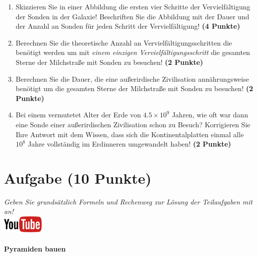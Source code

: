 \documentclass[a4paper, 9pt]{scrartcl}\usepackage[]{graphicx}\usepackage[]{xcolor}
\begin{document}
\begin{enumerate}
\item Skizzieren Sie in einer Abbildung die ersten vier Schritte der
  Vervielf{\"a}ltigung der Sonden in der Galaxie! Beschriften Sie die Abbildung
  mit der Dauer und der Anzahl an Sonden f{\"u}r jeden Schritt der Vervielf{\"a}ltigung! \textbf{(4 Punkte)}
\item Berechnen Sie die theoretische Anzahl an Vervielf{\"a}ltigungsschritten die
  ben{\"o}tigt werden um mit \textit{einem einzigen Vervielf{\"a}ltigungsschritt} die
  gesamten Sterne der Milchstra{\ss}e mit Sonden zu besuchen! \textbf{(2 Punkte)}
\item Berechnen Sie die Dauer, die eine au{\ss}erirdische Zivilisation
  ann{\"a}hrungsweise ben{\"o}tigt um die gesamten Sterne der Milchstra{\ss}e mit
  Sonden zu besuchen! \textbf{(2 Punkte)}
\item Bei einem vermutetet Alter der Erde von $\ensuremath{4.5\times 10^{9}}$ Jahren,
  wie oft war dann eine Sonde einer au{\ss}erirdischen Zivilisation schon zu
  Besuch? Korrigieren Sie Ihre Antwort mit dem Wissen, dass sich die
  Kontinentalplatten einmal alle $\ensuremath{10^{8}}$ Jahre vollst{\"a}ndig im
  Erdinneren umgewandelt haben! \textbf{(2 Punkte)}
\end{enumerate}


 
\clearpage

\section{Aufgabe \hfill (10 Punkte)}

\textit{Geben Sie grunds{\"a}tzlich Formeln und Rechenweg zur L{\"o}sung der
  Teilaufgaben mit an!} \\[1Ex]

\hfill\href{https://youtu.be/tDgr6fpkkYA}{\includegraphics[width =
  2cm]{img/youtube}} %
\hspace{2Ex}

\paragraph{Pyramiden bauen}
\end{document}
